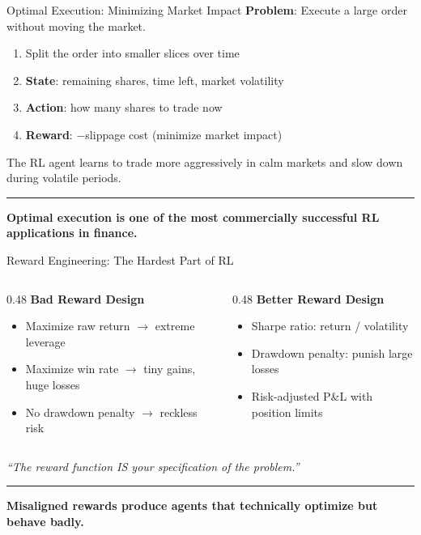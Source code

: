 \documentclass[8pt,aspectratio=169]{beamer}
\newcommand{\bottomnote}[1]{%
\vfill
\vspace{-2mm}
\textcolor{mllavender2}{\rule{\textwidth}{0.4pt}}
\vspace{1mm}
\footnotesize
\textbf{#1}
}
\newenvironment{compactlist}{%
  \begin{itemize}%
    \setlength{\itemsep}{2pt}%
    \setlength{\parskip}{0pt}%
    \setlength{\parsep}{0pt}%
}{%
  \end{itemize}%
}
\begin{document}
\begin{frame}{Optimal Execution: Minimizing Market Impact}
\textbf{Problem}: Execute a large order without moving the market.

\begin{enumerate}
  \item Split the order into smaller slices over time
  \item \textbf{State}: remaining shares, time left, market volatility
  \item \textbf{Action}: how many shares to trade now
  \item \textbf{Reward}: $-$slippage cost (minimize market impact)
\end{enumerate}

\vspace{4pt}
The RL agent learns to trade more aggressively in calm markets
and slow down during volatile periods.

\bottomnote{Optimal execution is one of the most commercially successful RL applications in finance.}
\end{frame}

\begin{frame}{Reward Engineering: The Hardest Part of RL}
\begin{columns}[T]
\begin{column}{0.48\textwidth}
\textbf{\textcolor{mlred}{Bad Reward Design}}
\begin{compactlist}
  \item Maximize raw return $\rightarrow$ extreme leverage
  \item Maximize win rate $\rightarrow$ tiny gains, huge losses
  \item No drawdown penalty $\rightarrow$ reckless risk
\end{compactlist}
\end{column}
\begin{column}{0.48\textwidth}
\textbf{\textcolor{mlgreen}{Better Reward Design}}
\begin{compactlist}
  \item Sharpe ratio: return / volatility
  \item Drawdown penalty: punish large losses
  \item Risk-adjusted P\&L with position limits
\end{compactlist}
\end{column}
\end{columns}

\vspace{4pt}
\centering
\textit{``The reward function IS your specification of the problem.''}

\bottomnote{Misaligned rewards produce agents that technically optimize but behave badly.}
\end{frame}
\end{document}
